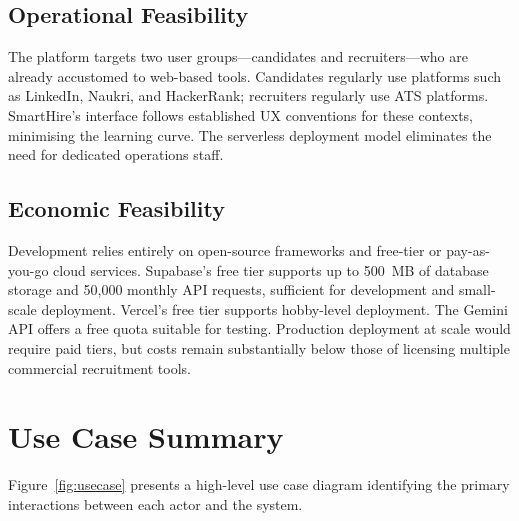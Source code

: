\subsection{Operational Feasibility}

The platform targets two user groups---candidates and recruiters---who are already accustomed to web-based tools. Candidates regularly use platforms such as LinkedIn, Naukri, and HackerRank; recruiters regularly use ATS platforms. SmartHire's interface follows established UX conventions for these contexts, minimising the learning curve. The serverless deployment model eliminates the need for dedicated operations staff.

\subsection{Economic Feasibility}

Development relies entirely on open-source frameworks and free-tier or pay-as-you-go cloud services. Supabase's free tier supports up to 500~MB of database storage and 50,000 monthly API requests, sufficient for development and small-scale deployment. Vercel's free tier supports hobby-level deployment. The Gemini API offers a free quota suitable for testing. Production deployment at scale would require paid tiers, but costs remain substantially below those of licensing multiple commercial recruitment tools.

\section{Use Case Summary}
\label{sec:usecases}

Figure~\ref{fig:usecase} presents a high-level use case diagram identifying the primary interactions between each actor and the system.

